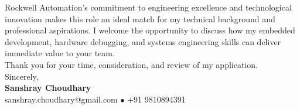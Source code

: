 \documentclass[10pt,a4paper]{article}%
\begin{document}
\noindent Rockwell Automation's commitment to engineering excellence and technological innovation makes this role an ideal match for my technical background and professional aspirations. I welcome the opportunity to discuss how my embedded development, hardware debugging, and systems engineering skills can deliver immediate value to your team. \vspace{8pt}\\%

\noindent Thank you for your time, consideration, and review of my application. \vspace{18pt}\\%

\noindent Sincerely, \vspace{8pt}\\%
\textbf{Sanshray Choudhary} \\%
sanshray.choudhary@gmail.com $\bullet$ +91 9810894391 \\%
\end{document}
